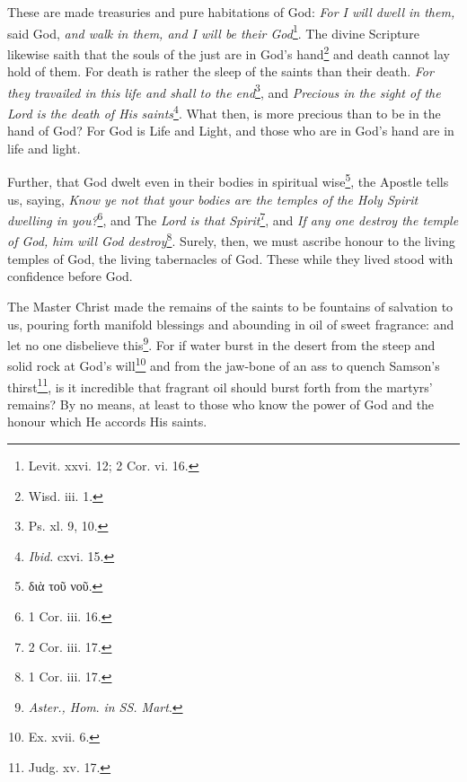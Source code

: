 These are made treasuries and pure habitations of God: \emph{For I will dwell in them, }said God, \emph{and walk in them, and I will be their God}\footnote{Levit. xxvi. 12; 2 Cor. vi. 16.}. The divine Scripture likewise saith that the souls of the just are in God’s hand\footnote{Wisd. iii. 1.} and death cannot lay hold of them. For death is rather the sleep of the saints than their death. \emph{For they travailed in this life and shall to the end}\footnote{Ps. xl. 9, 10.}, and \emph{Precious in the sight of the Lord is the death of His saints}\footnote{\emph{Ibid.} cxvi. 15.}. What then, is more precious than to be in the hand of God? For God is Life and Light, and those who are in God’s hand are in life and light.

Further, that God dwelt even in their bodies in spiritual wise\footnote{\textgreek{διὰ τοῦ νοῦ.}}, the Apostle tells us, saying, \emph{Know ye not that your bodies are the temples of the Holy Spirit dwelling in you?}\footnote{1 Cor. iii. 16.}, and The \emph{Lord is that Spirit}\footnote{2 Cor. iii. 17.}, and \emph{If any one destroy the temple of God, him will God destroy}\footnote{1 Cor. iii. 17.}. Surely, then, we must ascribe honour to the living temples of God, the living tabernacles of God. These while they lived stood with confidence before God.

The Master Christ made the remains of the saints to be fountains of salvation to us, pouring forth manifold blessings and abounding in oil of sweet fragrance: and let no one disbelieve this\footnote{\emph{Aster., Hom}. \emph{in SS. Mart}.}. For if water burst in the desert from the steep and solid rock at God’s will\footnote{Ex. xvii. 6.} and from the jaw-bone of an ass to quench Samson’s thirst\footnote{Judg. xv. 17.}, is it incredible that fragrant oil should burst forth from the martyrs’ remains? By no means, at least to those who know the power of God and the honour which He accords His saints.

